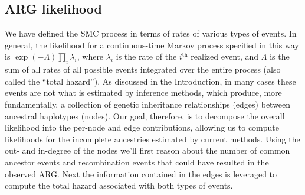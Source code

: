 \documentclass{article}
\newcommand{\comment}[1]{{\it \color{orange} (#1)}}
\begin{document}
\subsection*{ARG likelihood} \label{par:liks}
We have defined the SMC process in terms of rates of various types of events.
In general, the likelihood for a continuous-time Markov process specified in this way
is $\exp(-\Lambda) \prod_i \lambda_i$,
where $\lambda_i$ is the rate of the $i^\text{th}$ realized event,
and $\Lambda$ is the sum of all rates of all possible events
integrated over the entire process
(also called the ``total hazard''). 
As discussed in the Introduction, in many cases these events are not what is 
estimated by inference methods, which produce, more fundamentally, a collection
of genetic inheritance relationships (edges) between ancestral haplotypes (nodes).
Our goal, therefore, is to decompose the overall likelihood into the
per-node and edge contributions, allowing us to compute likelihoods
for the incomplete ancestries estimated by current methods.
Using the out- and in-degree of the nodes we'll first reason about the number 
of common ancestor events and recombination events that could have resulted in 
the observed ARG. Next the information contained in the edges is leveraged to 
compute the total hazard associated with both types of events.



\end{document}
